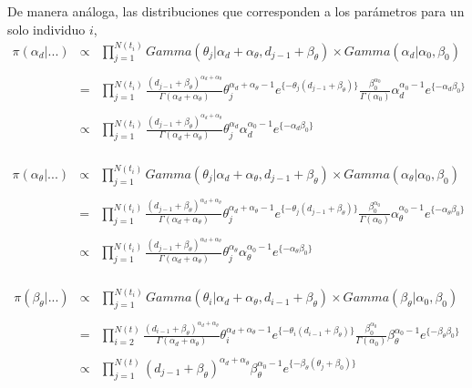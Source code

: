 De manera an\'aloga, las distribuciones que corresponden a los par\'ametros para un solo individuo $i$,
\begin{eqnarray*}
\pi(\alpha_d|...)&\propto& \prod_{j=1}^{N(t_i)} Gamma(\theta_j|\alpha_d+\alpha_\theta,d_{j-1}+\beta_\theta)\times Gamma(\alpha_d|\alpha_0,\beta_0)\\
\\
&=&\prod_{j=1}^{N(t_i)}\frac{(d_{j-1}+\beta_\theta)^{\alpha_d+\alpha_\theta}}{\Gamma(\alpha_d+\alpha_\theta)} \theta_j^{\alpha_d+\alpha_\theta-1} e^{\{-\theta_j(d_{j-1}+\beta_\theta)\}}\frac{\beta_0^{\alpha_0}}{\Gamma(\alpha_0)} \alpha_d^{\alpha_0-1}e^{\{-\alpha_d\beta_0\}}\\
\\
&\propto&\prod_{j=1}^{N(t_i)}\frac{(d_{j-1}+\beta_\theta)^{\alpha_d+\alpha_\theta}}{\Gamma(\alpha_d+\alpha_\theta)} \theta_j^{\alpha_d}\alpha_d^{\alpha_0-1}e^{\{-\alpha_d\beta_0\}}
\end{eqnarray*}
\\
\begin{eqnarray*}
\pi(\alpha_\theta|...)&\propto&\prod_{j=1}^{N(t_i)} Gamma(\theta_j|\alpha_d+\alpha_\theta,d_{j-1}+\beta_\theta)\times Gamma(\alpha_\theta|\alpha_0,\beta_0)\\
\\
&=&\prod_{j=1}^{N(t_i)}\frac{(d_{j-1}+\beta_\theta)^{\alpha_d+\alpha_\theta}}{\Gamma(\alpha_d+\alpha_\theta)} \theta_j^{\alpha_d+\alpha_\theta-1} e^{\{-\theta_j(d_{j-1}+\beta_\theta)\}}\frac{\beta_0^{\alpha_0}}{\Gamma(\alpha_0)} \alpha_\theta^{\alpha_0-1}e^{\{-\alpha_\theta\beta_0\}}\\
\\
&\propto& \prod_{j=1}^{N(t_i)}\frac{(d_{j-1}+\beta_\theta)^{\alpha_d+\alpha_\theta}}{\Gamma(\alpha_d+\alpha_\theta)} \theta_j^{\alpha_\theta}\alpha_\theta^{\alpha_0-1}e^{\{-\alpha_\theta\beta_0\}}
\end{eqnarray*}
\\
\begin{eqnarray*}
\pi(\beta_\theta|...)&\propto&\prod_{j=1}^{N(t_i)} Gamma(\theta_i|\alpha_d+\alpha_\theta,d_{i-1}+\beta_\theta)\times Gamma(\beta_\theta|\alpha_0,\beta_0)\\
\\
&=&\prod_{i=2}^{N(t)}\frac{(d_{i-1}+\beta_\theta)^{\alpha_d+\alpha_\theta}}{\Gamma(\alpha_d+\alpha_\theta)} \theta_i^{\alpha_d+\alpha_\theta-1} e^{\{-\theta_i(d_{i-1}+\beta_\theta)\}}\frac{\beta_0^{\alpha_0}}{\Gamma(\alpha_0)} \beta_\theta^{\alpha_0-1}e^{\{-\beta_\theta\beta_0\}}\\
\\
&\propto&\prod_{j=1}^{N(t)}(d_{j-1}+\beta_\theta)^{\alpha_d+\alpha_\theta}\beta_\theta^{\alpha_0-1} e^{\{-\beta_\theta(\theta_j+\beta_0)\}}
\end{eqnarray*}
